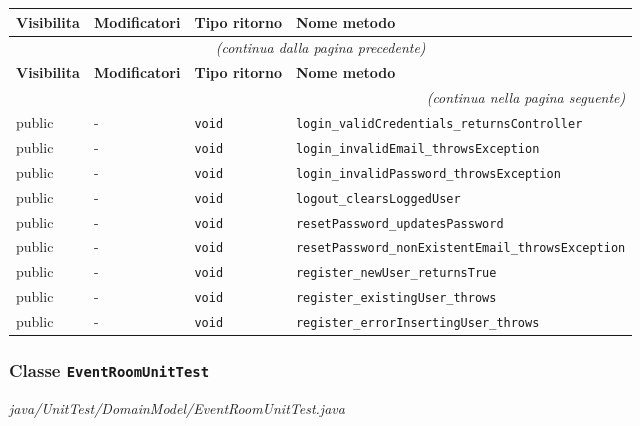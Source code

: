 \begin{longtable}{@{}llll@{}}
\toprule
\textbf{Visibilita} & \textbf{Modificatori} & \textbf{Tipo ritorno} & \textbf{Nome metodo} \\
\midrule
\endfirsthead
\multicolumn{4}{c}{\small\itshape (continua dalla pagina precedente)} \\
\toprule
\textbf{Visibilita} & \textbf{Modificatori} & \textbf{Tipo ritorno} & \textbf{Nome metodo} \\
\midrule
\endhead
\midrule
\multicolumn{4}{r}{\small\itshape (continua nella pagina seguente)} \\
\endfoot
\bottomrule
\endlastfoot
  public & - & \texttt{void} & \texttt{login\_validCredentials\_returnsController} \\
  public & - & \texttt{void} & \texttt{login\_invalidEmail\_throwsException} \\
  public & - & \texttt{void} & \texttt{login\_invalidPassword\_throwsException} \\
  public & - & \texttt{void} & \texttt{logout\_clearsLoggedUser} \\
  public & - & \texttt{void} & \texttt{resetPassword\_updatesPassword} \\
  public & - & \texttt{void} & \texttt{resetPassword\_nonExistentEmail\_throwsException} \\
  public & - & \texttt{void} & \texttt{register\_newUser\_returnsTrue} \\
  public & - & \texttt{void} & \texttt{register\_existingUser\_throws} \\
  public & - & \texttt{void} & \texttt{register\_errorInsertingUser\_throws} \\
\end{longtable}

\subsubsection*{Classe \texttt{EventRoomUnitTest}}\label{EventRoomUnitTest}
{\small\textit{java/UnitTest/DomainModel/EventRoomUnitTest.java}}
\vspace{4pt}

